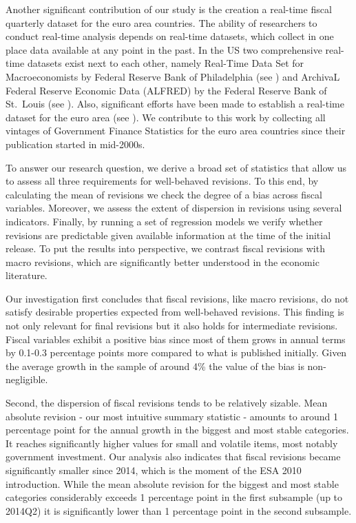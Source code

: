 \documentclass[
  letterpaper,
  authoryear,
  preprint,
  3p]{elsarticle}
\begin{document}
Another significant contribution of our study is the creation a
real-time fiscal quarterly dataset for the euro area countries. The
ability of researchers to conduct real-time analysis depends on
real-time datasets, which collect in one place data available at any
point in the past. In the US two comprehensive real-time datasets exist
next to each other, namely Real-Time Data Set for Macroeconomists by
Federal Reserve Bank of Philadelphia (see \citet{CROUSHORE2001111}) and
ArchivaL Federal Reserve Economic Data (ALFRED) by the Federal Reserve
Bank of St.~Louis (see \citet{ALFRED}). Also, significant efforts have
been made to establish a real-time dataset for the euro area (see
\citet{Giannone-et-al_2010_RevEconStat}). We contribute to this work by
collecting all vintages of Government Finance Statistics for the euro
area countries since their publication started in mid-2000s.

To answer our research question, we derive a broad set of statistics
that allow us to assess all three requirements for well-behaved
revisions. To this end, by calculating the mean of revisions we check
the degree of a bias across fiscal variables. Moreover, we assess the
extent of dispersion in revisions using several indicators. Finally, by
running a set of regression models we verify whether revisions are
predictable given available information at the time of the initial
release. To put the results into perspective, we contrast fiscal
revisions with macro revisions, which are significantly better
understood in the economic literature.

Our investigation first concludes that fiscal revisions, like macro
revisions, do not satisfy desirable properties expected from
well-behaved revisions. This finding is not only relevant for final
revisions but it also holds for intermediate revisions. Fiscal variables
exhibit a positive bias since most of them grows in annual terms by
0.1-0.3 percentage points more compared to what is published initially.
Given the average growth in the sample of around 4\% the value of the
bias is non-negligible.

Second, the dispersion of fiscal revisions tends to be relatively
sizable. Mean absolute revision - our most intuitive summary statistic -
amounts to around 1 percentage point for the annual growth in the
biggest and most stable categories. It reaches significantly higher
values for small and volatile items, most notably government investment.
Our analysis also indicates that fiscal revisions became significantly
smaller since 2014, which is the moment of the ESA 2010 introduction.
While the mean absolute revision for the biggest and most stable
categories considerably exceeds 1 percentage point in the first
subsample (up to 2014Q2) it is significantly lower than 1 percentage
point in the second subsample.
\end{document}
